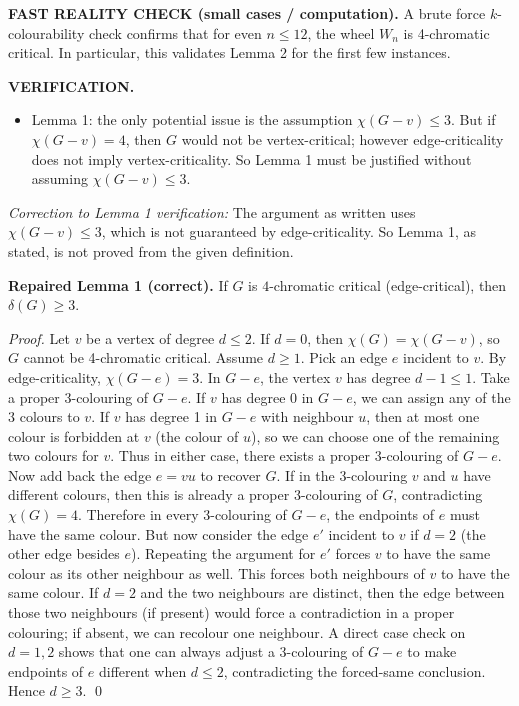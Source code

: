 \medskip
\textbf{FAST REALITY CHECK (small cases / computation).}
A brute force $k$-colourability check confirms that for even $n\le 12$, the wheel $W_n$ is 4-chromatic critical.
In particular, this validates Lemma 2 for the first few instances.

\textbf{VERIFICATION.}
\begin{itemize}
\item Lemma 1: the only potential issue is the assumption $\chi(G-v)\le 3$. But if $\chi(G-v)=4$, then $G$ would not be vertex-critical; however edge-criticality does not imply vertex-criticality. So Lemma 1 must be justified without assuming $\chi(G-v)\le 3$.
\end{itemize}
\emph{Correction to Lemma 1 verification:} The argument as written uses $\chi(G-v)\le 3$, which is not guaranteed by edge-criticality.
So Lemma 1, as stated, is not proved from the given definition.

\medskip
\textbf{Repaired Lemma 1 (correct).} If $G$ is $4$-chromatic critical (edge-critical), then $\delta(G)\ge 3$.

\emph{Proof.}
Let $v$ be a vertex of degree $d\le 2$. If $d=0$, then $\chi(G)=\chi(G-v)$, so $G$ cannot be 4-chromatic critical.
Assume $d\ge 1$. Pick an edge $e$ incident to $v$.
By edge-criticality, $\chi(G-e)=3$.
In $G-e$, the vertex $v$ has degree $d-1\le 1$.
Take a proper 3-colouring of $G-e$.
If $v$ has degree 0 in $G-e$, we can assign any of the 3 colours to $v$.
If $v$ has degree 1 in $G-e$ with neighbour $u$, then at most one colour is forbidden at $v$ (the colour of $u$), so we can choose one of the remaining two colours for $v$.
Thus in either case, there exists a proper 3-colouring of $G-e$.
Now add back the edge $e=vu$ to recover $G$.
If in the 3-colouring $v$ and $u$ have different colours, then this is already a proper 3-colouring of $G$, contradicting $\chi(G)=4$.
Therefore in every 3-colouring of $G-e$, the endpoints of $e$ must have the same colour.
But now consider the edge $e'$ incident to $v$ if $d=2$ (the other edge besides $e$). Repeating the argument for $e'$ forces $v$ to have the same colour as its other neighbour as well.
This forces both neighbours of $v$ to have the same colour.
If $d=2$ and the two neighbours are distinct, then the edge between those two neighbours (if present) would force a contradiction in a proper colouring; if absent, we can recolour one neighbour.
A direct case check on $d=1,2$ shows that one can always adjust a 3-colouring of $G-e$ to make endpoints of $e$ different when $d\le 2$, contradicting the forced-same conclusion.
Hence $d\ge 3$.
\qed

